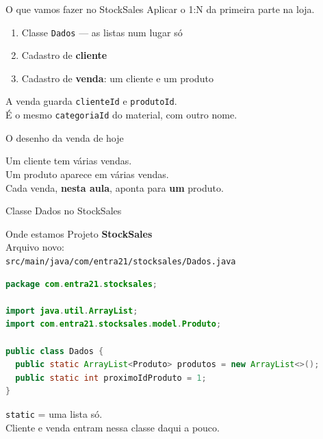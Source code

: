 \documentclass[aspectratio=169,11pt]{beamer}
\newcommand{\onde}[1]{%
  \begin{block}{Onde estamos}
    #1
  \end{block}
}
\begin{document}
\begin{frame}{O que vamos fazer no StockSales}
  Aplicar o 1{:}N da primeira parte na loja.

  \vspace{0.5em}
  \begin{enumerate}
    \item Classe \texttt{Dados} --- as listas num lugar só
    \item Cadastro de \textbf{cliente}
    \item Cadastro de \textbf{venda}: um cliente e um produto
  \end{enumerate}

  \vspace{0.5em}
  A venda guarda \texttt{clienteId} e \texttt{produtoId}.\\
  É o mesmo \texttt{categoriaId} do material, com outro nome.
\end{frame}

\begin{frame}{O desenho da venda de hoje}
  \begin{center}
  \end{center}

  \vspace{0.6em}
  Um cliente tem várias vendas.\\
  Um produto aparece em várias vendas.\\
  Cada venda, \textbf{nesta aula}, aponta para \textbf{um} produto.
\end{frame}

\begin{frame}[fragile]{Classe Dados no StockSales}
  \onde{Projeto \textbf{StockSales}\\
        Arquivo novo:\\
        \texttt{src/main/java/com/entra21/stocksales/Dados.java}}

\begin{lstlisting}[language=Java,basicstyle=\ttfamily\scriptsize]
package com.entra21.stocksales;

import java.util.ArrayList;
import com.entra21.stocksales.model.Produto;

public class Dados {
  public static ArrayList<Produto> produtos = new ArrayList<>();
  public static int proximoIdProduto = 1;
}
\end{lstlisting}

  \texttt{static} = uma lista só.\\
  Cliente e venda entram nessa classe daqui a pouco.
\end{frame}
\end{document}
